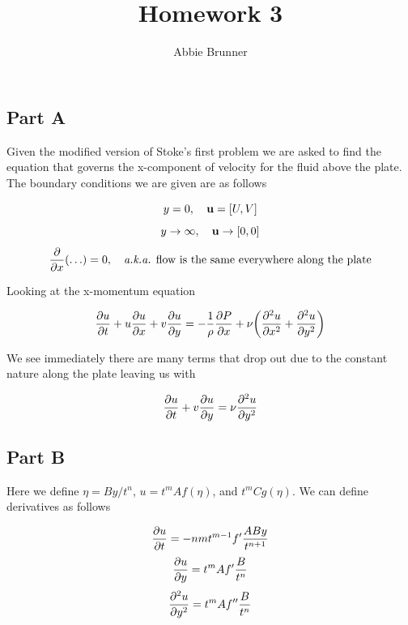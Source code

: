 \documentclass{report}
\title{Homework 3}
\author{Abbie Brunner}
\begin{document}
\maketitle

\tableofcontents

\chapter{}

\section{Part A}

Given the modified version of Stoke's first problem we are asked to find the equation that governs the x-component of velocity for the fluid above the plate.
The boundary conditions we are given are as follows

\begin{equation*}
   y = 0, \quad \vb{u} = [U, V]
\end{equation*}
\begin{equation*}
   y \rightarrow \infty, \quad \vb{u} \rightarrow [0, 0]
\end{equation*}
\begin{equation*}
   \pdv{x}\qty(\ldots) = 0, \quad \text{\emph{a.k.a.} flow is the same everywhere along the plate}
\end{equation*}

Looking at the x-momentum equation

\begin{equation}
   \pdv{u}{t} + u\pdv{u}{x} + v\pdv{u}{y} = -\frac{1}{\rho}\pdv{P}{x} + \nu\qty(\pdv[2]{u}{x}+\pdv[2]{u}{y})
\end{equation}

We see immediately there are many terms that drop out due to the constant nature along the plate leaving us with

\begin{equation}
   \pdv{u}{t} + v\pdv{u}{y} = \nu\pdv[2]{u}{y}
\end{equation}

\section{Part B}

Here we define $\eta=By/t^n$, $u=t^mAf(\eta)$, and $t^mCg(\eta)$.
We can define derivatives as follows

\begin{equation}
   \pdv{u}{t} = -nmt^{m-1}f'\frac{ABy}{t^{n+1}}
\end{equation}
\begin{equation}
   \pdv{u}{y} = t^mAf'\frac{B}{t^n}
\end{equation}
\begin{equation}
   \pdv[2]{u}{y} = t^m A f'' \frac{B}{t^n}
\end{equation}
\end{document}
